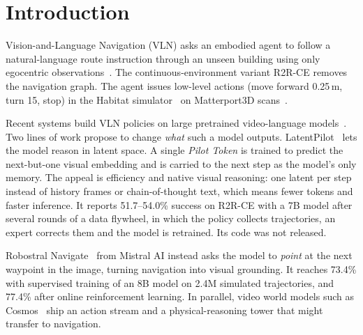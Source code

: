 \documentclass[11pt]{article}
\begin{document}
\section{Introduction}

Vision-and-Language Navigation (VLN) asks an embodied agent to follow a natural-language route instruction through an
unseen building using only egocentric observations~\citep{anderson2018r2r}. The continuous-environment variant R2R-CE
removes the navigation graph. The agent issues low-level actions (move forward 0.25\,m, turn 15\textdegree, stop) in
the Habitat simulator~\citep{krantz2020vlnce,savva2019habitat} on Matterport3D scans~\citep{chang2017mp3d}.

Recent systems build VLN policies on large pretrained video-language models~\citep{zhang2024navid,zhang2024uninavid,
cheng2024navila}. Two lines of work propose to change \emph{what} such a model outputs.
LatentPilot~\citep{latentpilot} lets the model reason in latent space. A single \emph{Pilot Token} is trained to predict
the next-but-one visual embedding and is carried to the next step as the model's only memory. The appeal is
efficiency and native visual reasoning: one latent per step instead of history frames or chain-of-thought text, which
means fewer tokens and faster inference. It reports 51.7--54.0\% success on R2R-CE with a 7B model after several rounds
of a data flywheel, in which the policy collects trajectories, an expert corrects them and the model is retrained. Its
code was not released.

Robostral Navigate~\citep{robostral} from Mistral AI instead asks the model to \emph{point} at the next waypoint in the
image, turning navigation into visual grounding. It reaches 73.4\% with supervised training of an 8B model on 2.4M
simulated trajectories, and 77.4\% after online reinforcement learning. In parallel, video world models such as
Cosmos~\citep{nvidia2025cosmoswfm,nvidia2026cosmos3edge} ship an action stream and a physical-reasoning tower that might
transfer to navigation.
\end{document}
